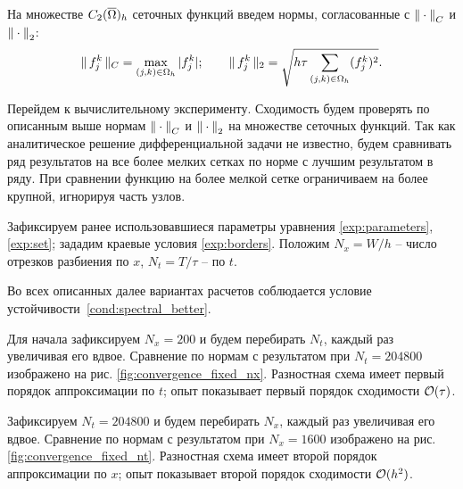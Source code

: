 На множестве $C_2({\overline{\Omega}})_h$ сеточных функций введем нормы, согласованные с ${\| \cdot \|}_C$ и ${\| \cdot \|}_2$:
$$\| \, f_j^k \, \|_C = \max \limits_{(j, k) \in \Omega_h} |f_j^k|; \qquad \| \, f_j^k \, \|_2 = \sqrt{h \tau \sum \limits_{(j, k) \in \Omega_h} (f_j^k)^2} {\text{.}}$$

Перейдем к вычислительному эксперименту. Сходимость будем проверять по описанным выше нормам ${\| \cdot \|}_C$ и ${\| \cdot \|}_2$ на множестве сеточных функций. Так как аналитическое решение дифференциальной задачи не известно, будем сравнивать ряд результатов на все более мелких сетках по норме с лучшим результатом в ряду. При сравнении функцию на более мелкой сетке ограничиваем на более крупной, игнорируя часть узлов.

Зафиксируем ранее использовавшиеся параметры уравнения \eqref{exp:parameters}, \eqref{exp:set}; зададим краевые условия \eqref{exp:borders}. Положим $N_x = W / h$ -- число отрезков разбиения по $x$, $N_t = T / \tau$ -- по $t$.

Во всех описанных далее вариантах расчетов соблюдается условие устойчивости~\eqref{cond:spectral_better}.

Для начала зафиксируем $N_x = 200$ и будем перебирать $N_t$, каждый раз увеличивая его вдвое. Сравнение по нормам с результатом при $N_t = 204800$ изображено на рис. \ref{fig:convergence_fixed_nx}. Разностная схема имеет первый порядок аппроксимации по $t$; опыт показывает первый порядок сходимости ${\mathcal{O}} (\tau)$.

Зафиксируем $N_t = 204800$ и будем перебирать $N_x$, каждый раз увеличивая его вдвое. Сравнение по нормам с результатом при $N_x = 1600$ изображено на рис. \ref{fig:convergence_fixed_nt}. Разностная схема имеет второй порядок аппроксимации по $x$; опыт показывает второй порядок сходимости ${\mathcal{O}} (h^2)$.

